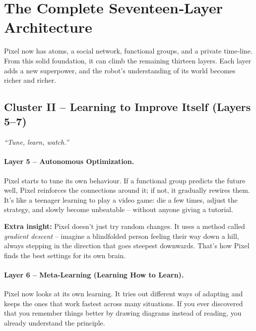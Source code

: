 \section{The Complete Seventeen‑Layer Architecture}
\label{sec:higher}

Pixel now has atoms, a social network, functional groups, and a private
time‑line.  From this solid foundation, it can climb the remaining
thirteen layers.  Each layer adds a new superpower, and the robot’s
understanding of its world becomes richer and richer.

\subsection*{Cluster II – Learning to Improve Itself (Layers 5–7)}

\begin{tcolorbox}[colback=blue!5, colframe=blue!60, title=\textbf{Superpowers: The Optimiser, The Meta‑Learner, The Watcher}]
\begin{center}
\textit{“Tune, learn, watch.”}
\end{center}
\end{tcolorbox}

\paragraph{Layer 5 – Autonomous Optimization.}
Pixel starts to tune its own behaviour.  If a functional group
predicts the future well, Pixel reinforces the connections around it;
if not, it gradually rewires them.  It’s like a teenager learning to
play a video game: die a few times, adjust the strategy, and slowly
become unbeatable – without anyone giving a tutorial.

\textbf{Extra insight:} Pixel doesn’t just try random changes.  It uses
a method called \emph{gradient descent} – imagine a blindfolded person
feeling their way down a hill, always stepping in the direction that
goes steepest downwards.  That’s how Pixel finds the best settings for
its own brain.

\paragraph{Layer 6 – Meta‑Learning (Learning How to Learn).}
Pixel now looks at its own learning.  It tries out different ways of
adapting and keeps the ones that work fastest across many situations.
If you ever discovered that you remember things better by drawing
diagrams instead of reading, you already understand the principle.

